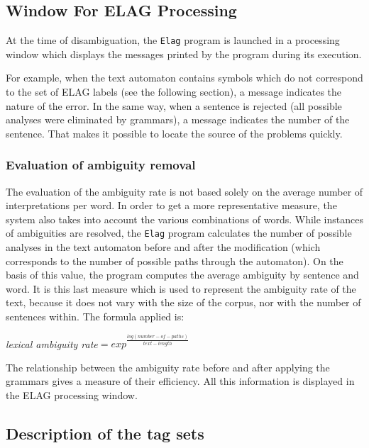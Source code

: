 \subsection{Window For ELAG Processing}
At the time of disambiguation, the \verb+Elag+ program
 is launched in a processing window which displays the
messages printed by the program during its execution.

\bigskip
\noindent For example, when the text automaton contains symbols which do not correspond to
the set of ELAG labels (see the following section), a message indicates the
nature of the error. In the same way, when a sentence is rejected (all possible
analyses were eliminated by grammars), a message indicates the number of the
sentence. That makes it possible to locate the source of the problems quickly.


\subsubsection{Evaluation of ambiguity removal}
The evaluation of the ambiguity rate is not based solely on the average number
of interpretations per word. In order to get a more representative measure, the
system also takes into account the various combinations of words. While instances
of ambiguities are resolved, the \verb+Elag+ program calculates the number of
possible analyses in the text automaton before and after the modification (which
corresponds to the number of possible paths through the automaton). On the basis
of this value, the program computes the average ambiguity by sentence and word.
It is this last measure which is used to represent the ambiguity rate of the 
text, because it does not vary with the size of the corpus, nor with the number of
sentences within. The formula applied is:


\bigskip
\begin{center}
\textit{lexical ambiguity rate}$=exp^{\frac{log(number-of-paths)}{text-length}}$
\end{center}

\bigskip \noindent The relationship between the ambiguity rate before and
after applying the grammars gives a measure of their efficiency. All this
information is displayed in the ELAG processing window.


\subsection{Description of the tag sets}
\label{section-elag-tagset}

